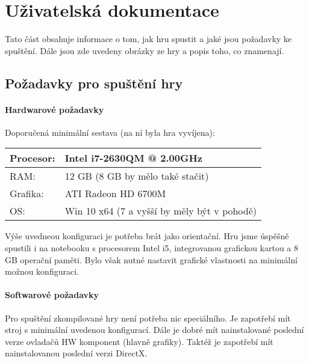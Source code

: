 
\chapter{Uživatelská dokumentace}

Tato část obsahuje informace o tom, jak hru spustit a jaké jsou požadavky ke spuštění. Dále jsou zde uvedeny obrázky ze hry a popis toho, co znamenají. 

\section{Požadavky pro spuštění hry}
\subsubsection{Hardwarové požadavky}

Doporučená minimální sestava (na ní byla hra vyvíjena): 

\begin{center}
	\begin{tabular} { | l | l |}
		\hline
		Procesor: 	&	Intel i7-2630QM @ 2.00GHz \\	\hline
		RAM:		&	12 GB	(8 GB by mělo také stačit) \\	\hline
		Grafika:	&	ATI Radeon HD 6700M \\	\hline
		OS:			&	Win 10 x64	(7 a vyšší by měly být v pohodě) \\
		\hline
	\end{tabular}
\end{center}

Výše uvedneou konfiguraci je potřeba brát jako orientační. Hru jsme úspěšně spustili i na notebooku s procesorem Intel i5, integrovanou grafickou kartou a 8 GB operační paměti. Bylo však nutné nastavit grafické vlastnosti na minimální možnou konfiguraci. 

\subsubsection{Softwarové požadavky}

Pro spuštění zkompilované hry není potřeba nic speciálního. Je zapotřebí mít stroj s minimální uvedenou konfigurací. Dále je dobré mít nainstalované poslední verze ovladačů HW komponent (hlavně grafiky).
Taktéž je zapotřebí mít nainstalovanou poslední verzi DirectX. 




%
%
%
%
%
%
%
%
%
%


